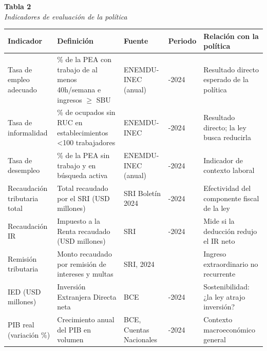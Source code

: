 \documentclass[12pt,spanish]{article}
\newcounter{none}
\begin{document}
\textbf{Tabla 2}\\
\emph{Indicadores de evaluación de la política}

{\def\LTcaptype{none} %
\begin{longtable}[]{@{}
  >{\raggedright\arraybackslash}p{}
  >{\raggedright\arraybackslash}p{}
  >{\raggedright\arraybackslash}p{}
  >{\raggedright\arraybackslash}p{}
  >{\raggedright\arraybackslash}p{}@{}}
\toprule\noalign{}
\begin{minipage}[b]{\linewidth}\raggedright
Indicador
\end{minipage} & \begin{minipage}[b]{\linewidth}\raggedright
Definición
\end{minipage} & \begin{minipage}[b]{\linewidth}\raggedright
Fuente
\end{minipage} & \begin{minipage}[b]{\linewidth}\raggedright
Periodo
\end{minipage} & \begin{minipage}[b]{\linewidth}\raggedright
Relación con la política
\end{minipage} \\
\midrule\noalign{}
\endhead
\bottomrule\noalign{}
\endlastfoot
Tasa de empleo adecuado & \% de la PEA con trabajo de al menos
40h/semana e ingresos \(\ge\) SBU & ENEMDU-INEC (anual) & 2021-2024 &
Resultado directo esperado de la política \\
Tasa de informalidad & \% de ocupados sin RUC en establecimientos
\textless100 trabajadores & ENEMDU-INEC & 2023-2024 & Resultado directo;
la ley busca reducirla \\
Tasa de desempleo & \% de la PEA sin trabajo y en búsqueda activa &
ENEMDU-INEC (anual) & 2021-2024 & Indicador de contexto laboral \\
Recaudación tributaria total & Total recaudado por el SRI (USD millones)
& SRI Boletín 2024 & 2023-2024 & Efectividad del componente fiscal de la
ley \\
Recaudación IR & Impuesto a la Renta recaudado (USD millones) & SRI &
2023-2024 & Mide si la deducción redujo el IR neto \\
Remisión tributaria & Monto recaudado por remisión de intereses y multas
& SRI, 2024 & 2024 & Ingreso extraordinario no recurrente \\
IED (USD millones) & Inversión Extranjera Directa neta & BCE & 2023-2024
& Sostenibilidad: ¿la ley atrajo inversión? \\
PIB real (variación \%) & Crecimiento anual del PIB en volumen & BCE,
Cuentas Nacionales & 2023-2024 & Contexto macroeconómico general \\
\end{longtable}
}
\end{document}
